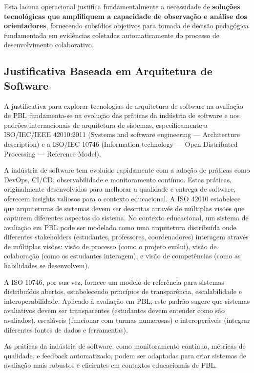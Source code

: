 \documentclass[english, spanish, brazilian]{RBIEarticle} %
\begin{document}
Esta lacuna operacional justifica fundamentalmente a necessidade de \textbf{soluções tecnológicas que amplifiquem a capacidade de observação e análise dos orientadores}, fornecendo subsídios objetivos para tomada de decisão pedagógica fundamentada em evidências coletadas automaticamente do processo de desenvolvimento colaborativo.

\subsection{Justificativa Baseada em Arquitetura de Software}

A justificativa para explorar tecnologias de arquitetura de software na avaliação de PBL fundamenta-se na evolução das práticas da indústria de software e nos padrões internacionais de arquitetura de sistemas, especificamente a ISO/IEC/IEEE 42010:2011 (Systems and software engineering — Architecture description) e a ISO/IEC 10746 (Information technology — Open Distributed Processing — Reference Model).

A indústria de software tem evoluído rapidamente com a adoção de práticas como DevOps, CI/CD, observabilidade e monitoramento contínuo. Estas práticas, originalmente desenvolvidas para melhorar a qualidade e entrega de software, oferecem insights valiosos para o contexto educacional. A ISO 42010 estabelece que arquiteturas de sistemas devem ser descritas através de múltiplas visões que capturem diferentes aspectos do sistema. No contexto educacional, um sistema de avaliação em PBL pode ser modelado como uma arquitetura distribuída onde diferentes stakeholders (estudantes, professores, coordenadores) interagem através de múltiplas visões: visão de processo (como o projeto evolui), visão de colaboração (como os estudantes interagem), e visão de competências (como as habilidades se desenvolvem).

A ISO 10746, por sua vez, fornece um modelo de referência para sistemas distribuídos abertos, estabelecendo princípios de transparência, escalabilidade e interoperabilidade. Aplicado à avaliação em PBL, este padrão sugere que sistemas avaliativos devem ser transparentes (estudantes devem entender como são avaliados), escaláveis (funcionar com turmas numerosas) e interoperáveis (integrar diferentes fontes de dados e ferramentas).

As práticas da indústria de software, como monitoramento contínuo, métricas de qualidade, e feedback automatizado, podem ser adaptadas para criar sistemas de avaliação mais robustos e eficientes em contextos educacionais de PBL.
\end{document}
